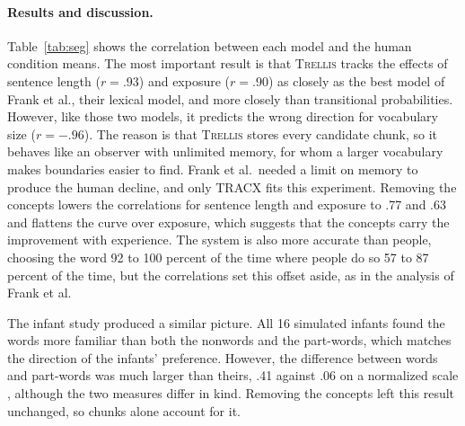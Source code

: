 \documentclass[11pt,letterpaper]{article}
\newcommand{\trellis}{\textsc{Trellis}}
\begin{document}
\paragraph{Results and discussion.} Table~\ref{tab:seg} shows the correlation between
each model and the human condition means. The most important result is that \trellis{}
tracks the effects of sentence length ($r = .93$) and exposure ($r = .90$) as closely as
the best model of Frank et al., their lexical model, and more closely than transitional
probabilities. However, like those two models, it predicts the wrong direction for
vocabulary size ($r = -.96$). The reason is that \trellis{} stores every candidate chunk,
so it behaves like an observer with unlimited memory, for whom a larger vocabulary makes
boundaries easier to find. Frank et al.\ needed a limit on memory to produce the human
decline, and only TRACX fits this experiment. Removing the concepts lowers the
correlations for sentence length and exposure to .77 and .63 and flattens the curve over
exposure, which suggests that the concepts carry the improvement with experience. The
system is also more accurate than people, choosing the word 92 to 100 percent of the time
where people do so 57 to 87 percent of the time, but the correlations set this offset
aside, as in the analysis of Frank et al.

The infant study produced a similar picture. All 16 simulated infants found the words
more familiar than both the nonwords and the part-words, which matches the direction of
the infants' preference. However, the difference between words and part-words was much
larger than theirs, .41 against .06 on a normalized scale \citep{french-tracx}, although
the two measures differ in kind. Removing the concepts left this result unchanged, so
chunks alone account for it.
\end{document}
